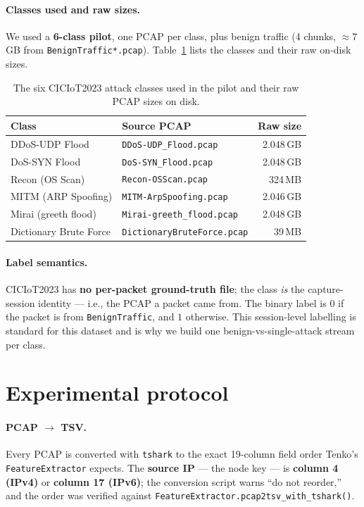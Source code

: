 \documentclass[11pt]{article}
\begin{document}
\paragraph{Classes used and raw sizes.} We used a \textbf{6-class pilot}, one PCAP per class,
plus benign traffic (4 chunks, $\approx$7\,GB from \texttt{BenignTraffic*.pcap}). Table~\ref{tab:classes}
lists the classes and their raw on-disk sizes.

\begin{table}[t]
\centering
\caption{The six CICIoT2023 attack classes used in the pilot and their raw PCAP sizes on disk.}
\label{tab:classes}
\begin{tabular}{llr}
\toprule
\textbf{Class} & \textbf{Source PCAP} & \textbf{Raw size} \\
\midrule
DDoS-UDP Flood         & \texttt{DDoS-UDP\_Flood.pcap}        & 2.048\,GB \\
DoS-SYN Flood          & \texttt{DoS-SYN\_Flood.pcap}         & 2.048\,GB \\
Recon (OS Scan)        & \texttt{Recon-OSScan.pcap}           & 324\,MB \\
MITM (ARP Spoofing)    & \texttt{MITM-ArpSpoofing.pcap}       & 2.046\,GB \\
Mirai (greeth flood)   & \texttt{Mirai-greeth\_flood.pcap}    & 2.048\,GB \\
Dictionary Brute Force & \texttt{DictionaryBruteForce.pcap}   & 39\,MB \\
\bottomrule
\end{tabular}
\end{table}

\paragraph{Label semantics.} CICIoT2023 has \textbf{no per-packet ground-truth file}; the class
\emph{is} the capture-session identity --- i.e., the PCAP a packet came from. The binary label is
$0$ if the packet is from \texttt{BenignTraffic}, and $1$ otherwise. This session-level labelling
is standard for this dataset and is why we build one benign-vs-single-attack stream per class.

\section{Experimental protocol}
\label{sec:protocol}

\paragraph{PCAP $\rightarrow$ TSV.} Every PCAP is converted with \texttt{tshark} to the exact
19-column field order Tenko's \texttt{FeatureExtractor} expects. The \textbf{source IP} --- the
node key --- is \textbf{column 4 (IPv4)} or \textbf{column 17 (IPv6)}; the conversion script
warns ``do not reorder,'' and the order was verified against
\texttt{FeatureExtractor.pcap2tsv\_with\_tshark()}.
\end{document}
